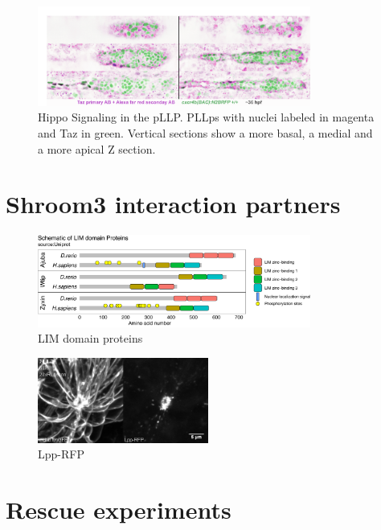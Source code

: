 \documentclass[11pt,singlespacinge,twoside]{reedthesis} %
\begin{document}
\begin{figure}

{\centering \includegraphics[width=0.8\textwidth]{figures/supp/immunos} 

}

\caption[Hippo Signaling in the pLLP]{Hippo Signaling in the pLLP. PLLps with nuclei labeled in magenta and Taz in green. Vertical sections show a more basal, a medial and a more apical Z section.}\label{fig:suppyap}
\end{figure}
\hypertarget{shroom3-interaction-partners}{%
\chapter{Shroom3 interaction partners}\label{shroom3-interaction-partners}}


\begin{figure}

{\centering \includegraphics[width=0.8\textwidth]{figures/supp/lim} 

}

\caption[LIM domain proteins]{LIM domain proteins}\label{fig:supplim}
\end{figure}

\begin{figure}

{\centering \includegraphics[width=0.5\textwidth]{figures/supp/partners/lpprfp} 

}

\caption[Lpp-RFP]{Lpp-RFP}\label{fig:supplpp}
\end{figure}
\hypertarget{rescue-experiments-1}{%
\chapter{Rescue experiments}\label{rescue-experiments-1}}
\end{document}
